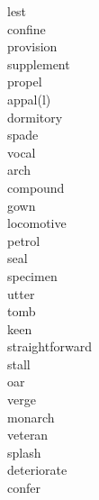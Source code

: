 \documentclass[a4paper, 11pt]{ctexart}
\begin{document}
\begin{multicols*}{3}
\begin{description}
\item[lest]

\item[confine]

\item[provision]

\item[supplement]

\item[propel]

\item[appal(l)]

\item[dormitory]

\item[spade]

\item[vocal]

\item[arch]

\item[compound]

\item[gown]

\item[locomotive]

\item[petrol]

\item[seal]

\item[specimen]

\item[utter]

\item[tomb]

\item[keen]

\item[straightforward]

\item[stall]

\item[oar]

\item[verge]

\item[monarch]

\item[veteran]

\item[splash]

\item[deteriorate]

\item[confer]


\end{description}
\end{multicols*}
\end{document}
